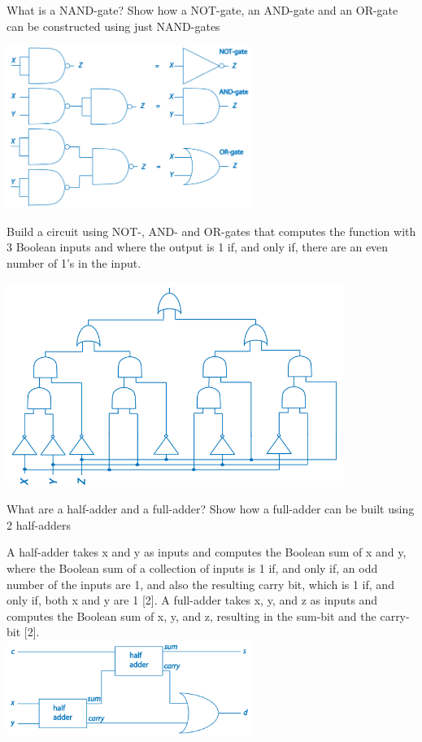 \documentclass{exam}
\begin{document}
\begin{questions}
\question[10] What is a NAND-gate? Show how a NOT-gate, an AND-gate and an
OR-gate can be constructed using just NAND-gates
\begin{solution}[.2in]
\includegraphics[width=8cm]{NAND.png}
\end{solution}
\newpage
\question[6]Build a circuit using NOT-, AND- and OR-gates that computes the
function with 3 Boolean inputs and where the output is 1 if, and only
if, there are an even number of 1’s in the input.
\begin{solution}[.2in]
\includegraphics[width=11cm]{even.png}
\end{solution}
\question[7]What are a half-adder and a full-adder? Show how a full-adder can be
built using 2 half-adders
\begin{solution}[.2in]
A half-adder takes x and y as inputs and computes the Boolean sum
of x and y, where the Boolean sum of a collection of inputs is 1 if, and
only if, an odd number of the inputs are 1, and also the resulting carry
bit, which is 1 if, and only if, both x and y are 1 [2]. A full-adder takes
x, y, and z as inputs and computes the Boolean sum of x, y, and z,
resulting in the sum-bit and the carry-bit [2].\\
\includegraphics[width=8cm]{full_adder.png}

\end{solution}
\end{questions}
\end{document}
